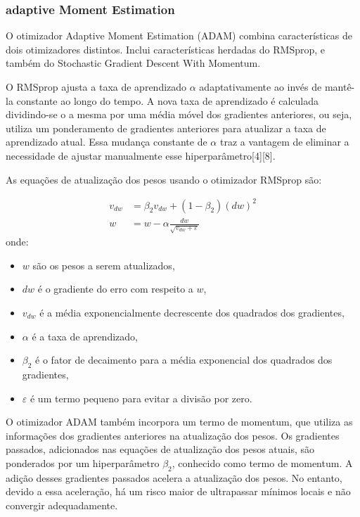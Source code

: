 \documentclass[conference]{IEEEtran}
\begin{document}
\subsubsection{adaptive Moment Estimation}

O otimizador Adaptive Moment Estimation (ADAM) combina características de dois otimizadores distintos. Inclui características herdadas do RMSprop, e também do Stochastic Gradient Descent With Momentum.

O RMSprop ajusta a taxa de aprendizado \( \alpha \) adaptativamente ao invés de mantê-la constante ao longo do tempo. A nova taxa de aprendizado é calculada dividindo-se o a mesma por uma média móvel dos gradientes anteriores, ou seja, utiliza um ponderamento de gradientes anteriores para atualizar a taxa de aprendizado atual. Essa mudança constante de \( \alpha \) traz a vantagem de eliminar a necessidade de ajustar manualmente esse hiperparâmetro[4][8].

As equações de atualização dos pesos usando o otimizador RMSprop são:

\begin{align*}
v_{dw} & = \beta_{2} v_{dw} + (1 - \beta_{2}) (dw)^2 \\
w & = w - \alpha \frac{dw}{\sqrt{v_{dw} + \varepsilon}}
\end{align*}
onde:
\begin{itemize}
    \item \( w \) são os pesos a serem atualizados,
    \item \( dw \) é o gradiente do erro com respeito a \( w \),
    \item \( v_{dw} \) é a média exponencialmente decrescente dos quadrados dos gradientes,
    \item \( \alpha \) é a taxa de aprendizado,
    \item \( \beta_{2} \) é o fator de decaimento para a média exponencial dos quadrados dos gradientes,
    \item \( \varepsilon \) é um termo pequeno para evitar a divisão por zero.
\end{itemize}

O otimizador ADAM também incorpora um termo de momentum, que utiliza as informações dos gradientes anteriores na atualização dos pesos. Os gradientes passados, adicionados nas equações de atualização dos pesos atuais, são ponderados por um hiperparâmetro \( \beta_{2} \), conhecido como termo de momentum. A adição desses gradientes passados acelera a atualização dos pesos. No entanto, devido a essa aceleração, há um risco maior de ultrapassar mínimos locais e não convergir adequadamente.
\end{document}
